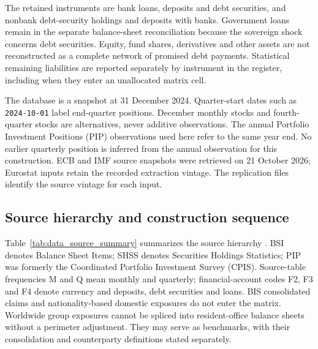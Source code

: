 The retained instruments are bank loans, deposits and debt securities, and nonbank debt-security holdings and deposits with banks. Government loans remain in the separate balance-sheet reconciliation because the sovereign shock concerns debt securities. Equity, fund shares, derivatives and other assets are not reconstructed as a complete network of promised debt payments. Statistical remaining liabilities are reported separately by instrument in the register, including when they enter an unallocated matrix cell.

The database is a snapshot at 31 December 2024. Quarter-start dates such as \texttt{2024-10-01} label end-quarter positions. December monthly stocks and fourth-quarter stocks are alternatives, never additive observations. The annual Portfolio Investment Positions (PIP) observations used here refer to the same year end. No earlier quarterly position is inferred from the annual observation for this construction. ECB and IMF source snapshots were retrieved on 21 October 2026; Eurostat inputs retain the recorded extraction vintage. The replication files identify the source vintage for each input.

\subsection{Source hierarchy and construction sequence}

Table~\ref{tab:data_source_summary} summarizes the source hierarchy \citep{ECBData,EurostatData,IMFPIP}. BSI denotes Balance Sheet Items; SHSS denotes Securities Holdings Statistics; PIP was formerly the Coordinated Portfolio Investment Survey (CPIS). Source-table frequencies M and Q mean monthly and quarterly; financial-account codes F2, F3 and F4 denote currency and deposits, debt securities and loans. BIS consolidated claims and nationality-based domestic exposures do not enter the matrix. Worldwide group exposures cannot be spliced into resident-office balance sheets without a perimeter adjustment. They may serve as benchmarks, with their consolidation and counterparty definitions stated separately.

